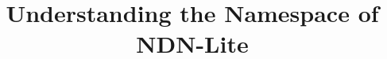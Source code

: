 \documentclass[conference]{sig-alternate-10pt}
\title{Understanding the Namespace of NDN-Lite}
\begin{document}
\maketitle


\begin{abstract}


\end{abstract}


















%
%
\end{document}
